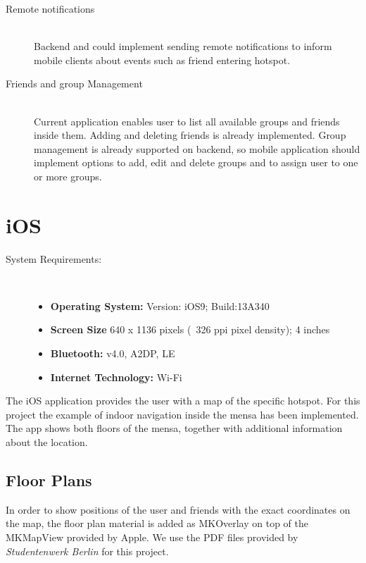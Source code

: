 \begin{description}
  \item[Remote notifications] \hfill \\
  Backend and could implement sending remote notifications to inform mobile clients about events such as friend entering hotspot.
  \item[Friends and group Management] \hfill \\
  Current application enables user to list all available groups and friends inside them. Adding and deleting friends is already implemented. Group management is already supported on backend, so mobile application should implement options to add, edit and delete groups and to assign user to one or more groups.

\end{description}
\pagebreak


\section{iOS}

\begin{description}
\item[System Requirements:] \hfill \\
\begin{itemize}
  \item \textbf{Operating System:} Version: iOS9; Build:13A340
  \item \textbf{Screen Size} 640 x 1136 pixels (~326 ppi pixel density); 4 inches
  \item \textbf{Bluetooth:} v4.0, A2DP, LE
  \item \textbf{Internet Technology:} Wi-Fi
\end{itemize}
\end{description}

The iOS application provides the user with a map of the specific hotspot. For this project the example of indoor navigation inside the mensa has been implemented. The app shows both floors of the mensa, together with additional information about the location.

\subsection{Floor Plans}
In order to show positions of the user and friends with the exact coordinates on the map, the floor plan material is added as MKOverlay on top of the MKMapView provided by Apple. We use the PDF files provided by \textit{Studentenwerk Berlin} for this project.

